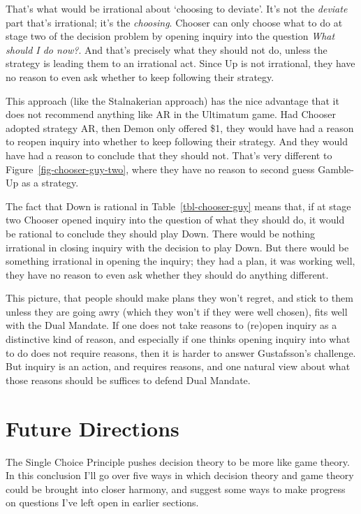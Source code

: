 \documentclass[
  11pt,
  letterpaper,
  DIV=11,
  numbers=noendperiod,
  twoside]{scrartcl}
\begin{document}
That's what would be irrational about `choosing to deviate'. It's not
the \emph{deviate} part that's irrational; it's the \emph{choosing}.
Chooser can only choose what to do at stage two of the decision problem
by opening inquiry into the question \emph{What should I do now?}. And
that's precisely what they should not do, unless the strategy is leading
them to an irrational act. Since Up is not irrational, they have no
reason to even ask whether to keep following their strategy.

This approach (like the Stalnakerian approach) has the nice advantage
that it does not recommend anything like AR in the Ultimatum game. Had
Chooser adopted strategy AR, then Demon only offered \$1, they would
have had a reason to reopen inquiry into whether to keep following their
strategy. And they would have had a reason to conclude that they should
not. That's very different to Figure~\ref{fig-chooser-guy-two}, where
they have no reason to second guess Gamble-Up as a strategy.

The fact that Down is rational in Table~\ref{tbl-chooser-guy} means
that, if at stage two Chooser opened inquiry into the question of what
they should do, it would be rational to conclude they should play Down.
There would be nothing irrational in closing inquiry with the decision
to play Down. But there would be something irrational in opening the
inquiry; they had a plan, it was working well, they have no reason to
even ask whether they should do anything different.

This picture, that people should make plans they won't regret, and stick
to them unless they are going awry (which they won't if they were well
chosen), fits well with the Dual Mandate. If one does not take reasons
to (re)open inquiry as a distinctive kind of reason, and especially if
one thinks opening inquiry into what to do does not require reasons,
then it is harder to answer Gustafsson's challenge. But inquiry is an
action, and requires reasons, and one natural view about what those
reasons should be suffices to defend Dual Mandate.

\section{Future Directions}\label{sec-conclusion}

The Single Choice Principle pushes decision theory to be more like game
theory. In this conclusion I'll go over five ways in which decision
theory and game theory could be brought into closer harmony, and suggest
some ways to make progress on questions I've left open in earlier
sections.
\end{document}
